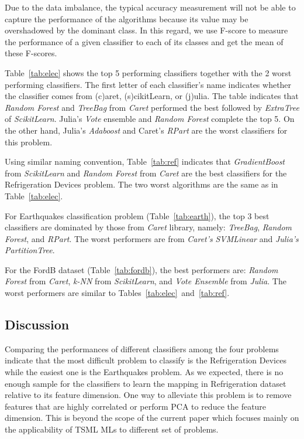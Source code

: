 \documentclass{juliacon}
\begin{document}
Due to the data imbalance, the typical accuracy measurement will not be able to capture the performance of the algorithms because its value may be overshadowed by the dominant class. In this regard, we use F-score to measure the performance of a given classifier to each of its classes and get the mean of these F-scores.

\vskip 6pt

Table~\ref{tab:elec} shows the top 5 performing classifiers together with the 2 worst performing classifiers. The first letter of each classifier's name indicates whether the classifier comes from (c)aret, (s)cikitLearn, or (j)ulia. The table indicates that \emph{Random Forest} and \emph{TreeBag} from \emph{Caret} performed the best followed by \emph{ExtraTree} of \emph{ScikitLearn}. Julia's \emph{Vote} ensemble and \emph{Random Forest} complete the top 5. On the other hand, Julia's \emph{Adaboost} and Caret's \emph{RPart} are the worst classifiers for this problem.  

\vskip 6pt

Using similar naming convention, Table~\ref{tab:ref} indicates that \emph{GradientBoost} from \emph{ScikitLearn} and \emph{Random Forest} from \emph{Caret} are the best classifiers for the Refrigeration Devices problem. The two worst algorithms are the same as in Table~\ref{tab:elec}.

\vskip 6pt

For Earthquakes classification problem (Table~\ref{tab:earth}), the top 3 best classifiers are dominated by those from \emph{Caret} library, namely: \emph{TreeBag}, \emph{Random Forest}, and \emph{RPart}. The worst performers are from \emph{Caret's} \emph{SVMLinear} and \emph{Julia's} \emph{PartitionTree}.

\vskip 6pt

For the FordB dataset (Table~\ref{tab:fordb}), the best performers are: \emph{Random Forest} from \emph{Caret}, \emph{k-NN} from \emph{ScikitLearn}, and \emph{Vote Ensemble} from \emph{Julia}. The worst performers are similar to Tables~\ref{tab:elec}~and~\ref{tab:ref}.

\subsection{Discussion}
Comparing the performances of different classifiers among the four problems indicate that the most difficult problem to classify is the Refrigeration Devices while the easiest one is the Earthquakes problem. As we expected, there is no enough sample for the classifiers to learn the mapping in Refrigeration dataset relative to its feature dimension. One way to alleviate this problem is to remove features that are highly correlated or perform PCA to reduce the feature dimension. This is beyond the scope of the current paper which focuses mainly on the applicability of TSML MLs to different set of problems. 
\end{document}
